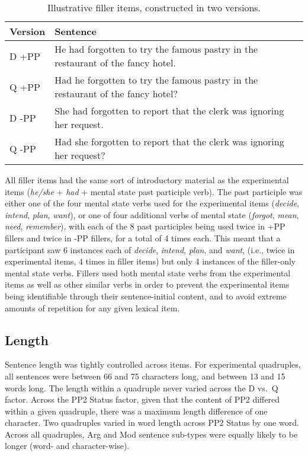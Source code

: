 \documentclass[11pt,oneside]{book}
\begin{document}
\begin{table}[!h]

\caption{\label{tab:fsentences}Illustrative filler items, constructed in two versions.}
\centering
\begin{tabular}{ll}
\toprule
Version & Sentence\\
\midrule
D +PP & He had forgotten to try the famous pastry in the restaurant of the fancy hotel.\\
Q +PP & Had he forgotten to try the famous pastry in the restaurant of the fancy hotel?\\
\hline
\addlinespace
D -PP & She had forgotten to report that the clerk was ignoring her request.\\
Q -PP & Had she forgotten to report that the clerk was ignoring her request?\\
\bottomrule
\end{tabular}
\end{table}

All filler items had the same sort of introductory material as the experimental items (\emph{he/she} + \emph{had} + mental state past participle verb). The past participle was either one of the four mental state verbs used for the experimental items (\emph{decide}, \emph{intend}, \emph{plan}, \emph{want}), or one of four additional verbs of mental state (\emph{forgot}, \emph{mean}, \emph{need}, \emph{remember}), with each of the 8 past participles being used twice in +PP fillers and twice in -PP fillers, for a total of 4 times each. This meant that a participant saw 6 instances each of \emph{decide}, \emph{intend}, \emph{plan}, and \emph{want}, (i.e., twice in experimental items, 4 times in filler items) but only 4 instances of the filler-only mental state verbs. Fillers used both mental state verbs from the experimental items as well as other similar verbs in order to prevent the experimental items being identifiable through their sentence-initial content, and to avoid extreme amounts of repetition for any given lexical item.

\hypertarget{length}{%
\subsection{Length}\label{length}}

Sentence length was tightly controlled across items. For experimental quadruples, all sentences were between 66 and 75 characters long, and between 13 and 15 words long. The length within a quadruple never varied across the D vs.~Q factor. Across the PP2 Status factor, given that the content of PP2 differed within a given quadruple, there was a maximum length difference of one character. Two quadruples varied in word length across PP2 Status by one word. Across all quadruples, Arg and Mod sentence sub-types were equally likely to be longer (word- and character-wise).
\end{document}
